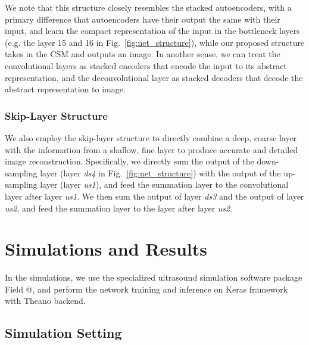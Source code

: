 \documentclass{article}
\makeatletter
\newcommand{\Rmnum}[1]{\expandafter\@slowromancap\romannumeral #1@}
\makeatother
\begin{document}
We note that this structure closely resembles the stacked autoencoders\cite{masci2011stacked,vincent2010stacked}, with a primary difference that autoencoders have their output the same with their input, and learn the compact representation of the input in the bottleneck layers (e.g. the layer 15 and 16 in Fig.~\ref{fig:net_structure}), while our proposed structure takes in the CSM and outputs an image. In another sense, we can treat the convolutional layers as stacked encoders that encode the input to its abstract representation, and the deconvolutional layer as stacked decoders that decode the abstract representation to image.

\subsubsection{Skip-Layer Structure}
\label{ssub:skip_layer}

We also employ the skip-layer structure to directly combine a deep, coarse layer with the information from a shallow, fine layer to produce accurate and detailed image reconstruction\cite{long2015fully}. Specifically, we directly sum the output of the down-sampling layer (layer \emph{ds4} in Fig.~\ref{fig:net_structure}) with the output of the up-sampling layer (layer \emph{us1}), and feed the summation layer to the convolutional layer after layer \emph{us1}. We then sum the output of layer \emph{ds3} and the output of layer \emph{us2}, and feed the summation layer to the layer after layer \emph{us2}.

\section{Simulations and Results}
\label{sec:simulations_results}

In the simulations, we use the specialized ultrasound simulation software package Field \Rmnum{2}\cite{}, and perform the network training and inference on Keras\cite{keras} framework with Theano\cite{theano2016short} backend.

\subsection{Simulation Setting}
\label{sub:simulation_setting}
\end{document}
